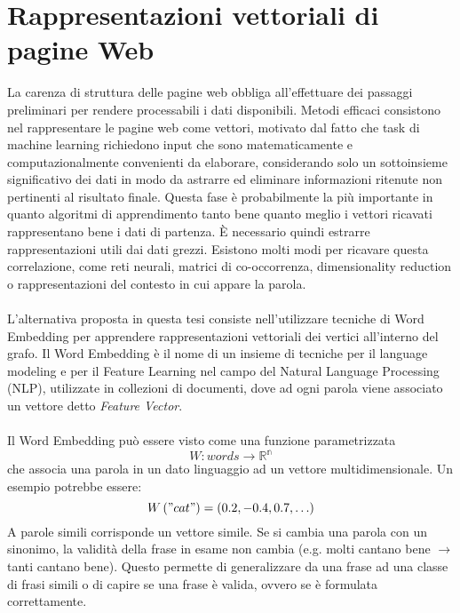 \section{Rappresentazioni vettoriali di pagine Web}
La carenza di struttura delle pagine web obbliga all'effettuare dei passaggi preliminari per rendere processabili i dati disponibili. Metodi efficaci consistono nel rappresentare le pagine web come vettori, motivato dal fatto che task di machine learning richiedono input che sono matematicamente e computazionalmente convenienti da elaborare, considerando solo un sottoinsieme significativo dei dati in modo da astrarre ed eliminare informazioni ritenute non pertinenti al risultato finale. Questa fase è probabilmente la più importante in quanto algoritmi di apprendimento tanto bene quanto meglio i vettori ricavati rappresentano bene i dati di partenza. È necessario quindi estrarre rappresentazioni utili dai dati grezzi. Esistono molti modi per ricavare questa correlazione, come reti neurali, matrici di co-occorrenza, dimensionality reduction o rappresentazioni del contesto in cui appare la parola. 
\\\\
L'alternativa proposta in questa tesi consiste nell'utilizzare tecniche di Word Embedding per apprendere rappresentazioni vettoriali dei vertici all'interno del grafo.
Il Word Embedding è il nome di un insieme di tecniche per il language modeling e per il Feature Learning nel campo del Natural Language Processing (NLP)\cite{Bengio03}, utilizzate  in collezioni di documenti, dove ad ogni parola viene associato un vettore detto \textit{Feature Vector}. 
\\\\
Il Word Embedding può essere visto come una funzione parametrizzata 
\begin{equation}
  W : words \to \mathbb{R^n}
\end{equation}
che associa una parola in un dato linguaggio ad un vettore multidimensionale. Un esempio potrebbe essere:
\begin{equation}
  W\left ( "cat" \right ) = \left ( 0.2, -0.4, 0.7, \ldots \right )
\end{equation}
A parole simili corrisponde un vettore simile. Se si cambia una parola con un sinonimo, la validità della frase in esame non cambia (e.g. molti cantano bene $\to$ tanti cantano bene). Questo permette di generalizzare da una frase ad una classe di frasi simili o di capire se una frase è valida, ovvero se  è formulata correttamente.  
\\\\
